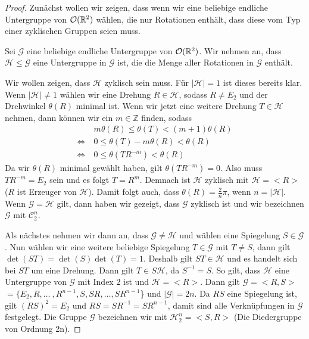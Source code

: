 \begin{proof}
	 Zunächst wollen wir zeigen, dass wenn wir eine beliebige endliche Untergruppe von ${\mathcal{O}(\mathbb{R}^2)}$ wählen, die nur Rotationen enthält, dass diese vom Typ einer zyklischen Gruppen seien muss. \par\smallskip  
	 Sei $\mathcal{G}$ eine beliebige endliche Untergruppe von ${\mathcal{O}(\mathbb{R}^2)}$. Wir nehmen an, dass $\mathcal{H} \leq \mathcal{G}$ eine Untergruppe in $\mathcal{G}$ ist, die die Menge aller Rotationen in $\mathcal{G}$ enthält. 
	 
	 Wir wollen zeigen, dass $\mathcal{H}$ zyklisch sein muss. Für $|\mathcal{H}|=1$ ist dieses bereits klar. Wenn $|\mathcal{H}| \neq 1$ wählen wir eine Drehung $R \in \mathcal{H}$, sodass $R \neq E_2$ und der Drehwinkel $\theta(R)$ minimal ist. Wenn wir jetzt eine weitere Drehung $T \in \mathcal{H}$ nehmen, dann können wir ein $m \in \mathbb{Z}$ finden, sodass \begin{align*}
	 &m \theta(R)\leq\theta(T)<(m+1)\theta(R) \\
	 \Leftrightarrow \ &0 \leq \theta(T)-m\theta(R)<\theta(R) \\
	 \Leftrightarrow \ &0 \leq \theta(TR^{-m})<\theta(R)                                                                                                                                                                                                                                                                                                                                                           
	 \end{align*}
	 Da wir $\theta(R)$ minimal gewählt haben, gilt $\theta(TR^{-m})=0$. Also muss $TR^{-m}=E_2$ sein und es folgt $T=R^{m}$. Demnach ist $\mathcal{H}$ zyklisch mit $\mathcal{H}=<R>$ ($R$ ist Erzeuger von $\mathcal{H}$). Damit folgt auch, dass $\theta(R)=\frac{2}{n}\pi$, wenn $n=|\mathcal{H}|$. Wenn $\mathcal{G} = \mathcal{H}$ gilt, dann haben wir gezeigt, dass $\mathcal{G}$ zyklisch ist und wir bezeichnen $\mathcal{G}$ mit $\mathcal{C}^n_2$.
	 
	 Als nächstes nehmen wir dann an, dass $\mathcal{G} \neq \mathcal{H}$ und wählen eine Spiegelung $S \in \mathcal{G}$. Nun wählen wir eine weitere beliebige Spiegelung $T \in \mathcal{G}$ mit $T \neq S$, dann gilt $\det(ST)=\det(S)\det(T)=1$. Deshalb gilt $ST \in \mathcal{H}$ und es handelt sich bei $ST$ um eine Drehung. Dann gilt $T \in S\mathcal{H}$, da $S^{-1}=S$. So gilt, dass $\mathcal{H}$ eine Untergruppe von $\mathcal{G}$ mit Index $2$ ist und $\mathcal{H}=<R>$. Dann gilt $\mathcal{G}=<R,S>$ $=\{E_2,R,\dots \ ,R^{n-1},S,SR,\dots ,SR^{n-1}$\} und $|\mathcal{G}|=2n$. Da $RS$ eine Spiegelung ist, gilt $(RS)^2=E_2$ und $RS=SR^{-1}=SR^{n-1}$, damit sind alle Verknüpfungen in $\mathcal{G}$ festgelegt. Die Gruppe $\mathcal{G}$ bezeichnen wir mit $\mathcal{H}^n_2=<S,R>$ (Die Diedergruppe von Ordnung 2n).
\end{proof}
